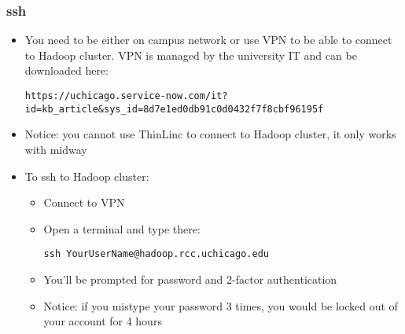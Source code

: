 \documentclass{beamer}
\begin{document}
\begin{frame}[fragile]
  \frametitle{ssh}
  \begin{itemize}
    \item You need to be either on campus network or use VPN to be able to connect to Hadoop cluster.
      VPN is managed by the university IT and can be downloaded here:
      {\color{mycolorcli}
        { \tiny
\begin{verbatim}
https://uchicago.service-now.com/it?id=kb_article&sys_id=8d7e1ed0db91c0d0432f7f8cbf96195f
\end{verbatim}
        }
      }
  \item Notice: you cannot use ThinLinc to connect to Hadoop cluster, it only works with midway
  \item To ssh to Hadoop cluster:
    \begin{itemize}
    \item Connect to VPN
    \item Open a terminal and type there:
      {\color{mycolorcli}
\begin{verbatim}
ssh YourUserName@hadoop.rcc.uchicago.edu
\end{verbatim}
      }
    \item You'll be prompted for password and 2-factor authentication
    \item Notice: if you mistype your password 3 times, you would be locked out of your account for 4 hours
    \end{itemize}
  \end{itemize}
\end{frame}
\end{document}
